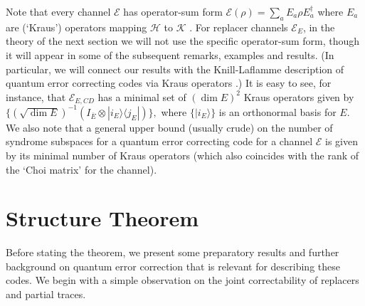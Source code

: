 \documentclass[11pt]{amsart}
\theoremstyle{definition}
\theoremstyle{definition}
\theoremstyle{definition}
\newcommand{\1}{\mathbb{I}}
\def\ket#1{| #1 \rangle}
\def\kb#1#2{|#1\rangle\!\langle #2 |}
\begin{document}
Note that every channel $\mathcal E$ has operator-sum form $\mathcal E(\rho) = \sum_a E_a \rho E_a^\dagger$ where $E_a$ are (`Kraus') operators mapping $\mathcal H$ to $\mathcal K$ \cite{nielsen2010quantum}. For replacer channels $\mathcal E_E$, in the theory of the next section we will not use the specific operator-sum form, though it will appear in some of the subsequent remarks,  examples and results. (In particular, we will connect our results with the Knill-Laflamme description of quantum error correcting codes via Kraus operators \cite{knill1997theory}.) It is easy to see, for instance, that $\mathcal E_{E,CD}$ has a minimal set of $(\dim E)^2$ Kraus operators given by 
$\{ {\scriptstyle (\sqrt{\dim E} )^{-1} } ( I_{\overline{E}} \otimes \kb{i_E}{j_E} ) \},$
where $\{\ket{i_E}\}$ is an orthonormal basis for $E$. We also note that a general upper bound (usually crude) on the number of syndrome subspaces for a quantum error correcting code for a channel $\mathcal E$ is given by its minimal number of Kraus operators (which also coincides with the rank of the `Choi matrix' \cite{C75} for the channel). 




\section{Structure Theorem}\label{sec:structure-thm}


Before stating the theorem, we present some preparatory results and further background on quantum error correction that is relevant for describing these codes. We begin with a simple observation on the joint correctability of replacers and partial traces. 
\end{document}
